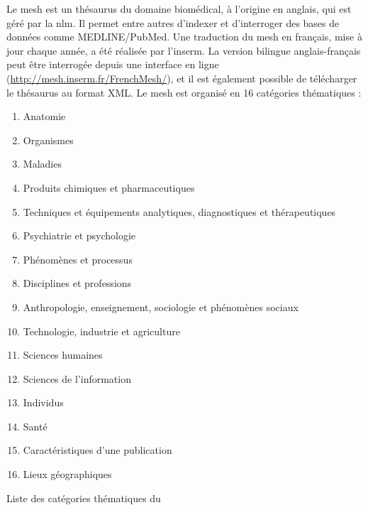 Le \gls{mesh} \cite{lipscombMedicalSubjectHeadings2000} est un thésaurus du domaine biomédical, à l'origine en anglais, qui est géré par la \gls{nlm}.
Il permet entre autres d'indexer et d'interroger des bases de données comme MEDLINE/PubMed.
Une traduction du \gls{mesh} en français, mise à jour chaque année, a été réalisée par l'\gls{inserm}.
La version bilingue anglais-français peut être interrogée depuis une interface en ligne (\url{http://mesh.inserm.fr/FrenchMesh/}), et il est également possible de télécharger le thésaurus au format XML.
Le \gls{mesh} est organisé en \num{16} catégories thématiques :

\begin{table}[H]
    \begin{multicols}{2}
        \begin{enumerate}[label=\textbf{\Alph*}]
            \item \label{mesh:A} Anatomie
            \item \label{mesh:B} Organismes
            \item \label{mesh:C} Maladies
            \item \label{mesh:D} Produits chimiques et pharmaceutiques
            \item \label{mesh:E} Techniques et équipements analytiques, diagnostiques et thérapeutiques
            \item \label{mesh:F} Psychiatrie et psychologie
            \item \label{mesh:G} Phénomènes et processus
            \item \label{mesh:H} Disciplines et professions
            \item \label{mesh:I} Anthropologie, enseignement, sociologie et phénomènes sociaux
            \item \label{mesh:J} Technologie, industrie et agriculture
            \item \label{mesh:K} Sciences humaines
            \item \label{mesh:L} Sciences de l'information
            \item \label{mesh:M} Individus
            \item \label{mesh:N} Santé
            \setcounter{enumi}{21}
            \item \label{mesh:V} Caractéristiques d'une publication
            \setcounter{enumi}{25}
            \item \label{mesh:Z} Lieux géographiques
        \end{enumerate}
    \end{multicols}
    \caption{Liste des catégories thématiques du }
\end{table}


